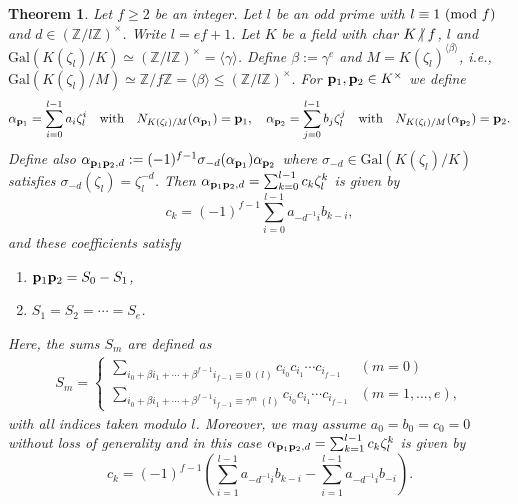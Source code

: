 \documentclass[a4paper, 11pt]{amsart}
\newcommand{\notmid}{\mathrel{\ooalign{$\mkern-5mu\not$\crcr$|$}}}
\newcommand{\Z}{\mathbb Z}
\newcommand{\Gal}{\mathrm{Gal}}
\theoremstyle{plain}
\newtheorem{thm}{Theorem}[section]
\theoremstyle{definition}
\numberwithin{equation}{section}
\begin{document}
\begin{thm}\label{thm:BF2}
Let $f\geq2$ be an integer. 
Let $l$ be an odd prime with $l \equiv 1\ ({\rm mod}\ f)$ and $d \in (\Z/l\Z)^{\times}$. 
Write $l=ef+1$.
Let $K$ be a field with char $K\notmid f$, $l$ and 
$\Gal(K(\zeta_l)/K)\simeq (\Z/l\Z)^{\times}=\langle \gamma \rangle$. 
Define $\beta := \gamma^e$ and $M=K(\zeta_l)^{\langle \beta \rangle}$, 
i.e., $\Gal(K(\zeta_l)/M)\simeq \Z/f\Z = \langle \beta \rangle \leq  (\Z/l\Z)^{\times}$.
For ${\bf p}_1, {\bf p}_2\in K^{\times}$ we define
\begin{align*}
\alpha_{{\bf p}_1}=\sum_{i=0}^{l-1}a_i\zeta_l^i\quad \text{with} \quad
N_{K(\zeta_l)/M}(\alpha_{{\bf p}_1})= {\bf p}_1, \quad \alpha_{{\bf p}_2}=\sum_{j=0}^{l-1}b_j\zeta_l^j\quad \text{with} \quad
N_{K(\zeta_l)/M}(\alpha_{{\bf p}_2})= {\bf p}_2.
\end{align*}
Define also $\alpha_{{\bf p}_1{\bf p}_2,d}:=(-1)^{f-1}\sigma_{-d}(\alpha_{{\bf p}_1})\alpha_{{\bf p}_2}$ where $\sigma_{-d}\in \Gal(K(\zeta_l)/K)$ satisfies $\sigma_{-d}(\zeta_l)=\zeta_l^{-d}$.
Then $\alpha_{{\bf p}_1{\bf p}_2,d} = \sum_{k=0}^{l-1} c_k\zeta_l^k$ is given by
$$c_k = (-1)^{f-1}\sum_{i=0}^{l-1}a_{-d^{-1}i}b_{k-i},$$
and these coefficients satisfy
\begin{enumerate}
\item ${\bf p}_1{\bf p}_2 = S_0 - S_1$,
\item $S_1 = S_2 = \cdots = S_e$.
\end{enumerate}
Here, the sums $S_m$ are defined as
\begin{align*}
S_m = 
\left\{
\begin{array}{ll}
\displaystyle
\sum_{i_0 + \beta i_1 + \cdots +\beta^{f-1}i_{f-1}\equiv 0 \ (l)}c_{i_0}c_{i_1}\cdots c_{i_{f-1}} & (m = 0)\\
\displaystyle
\sum_{i_0 + \beta i_1 + \cdots +\beta^{f-1}i_{f-1}\equiv \gamma^{m} \ (l)}c_{i_0}c_{i_1}\cdots c_{i_{f-1}} & (m = 1,\ldots,e),
\end{array}
\right.
\end{align*}
with all indices taken modulo $l$.
Moreover, we may assume $a_0=b_0=c_0=0$ 
without loss of generality and in this case 
$\alpha_{{\bf p}_1{\bf p}_2,d}=\sum_{k=1}^{l-1}c_k\zeta_l^k$ 
is  given by 
$$c_k=(-1)^{f-1}\left( \sum_{i=1}^{l-1}a_{-d^{-1}i}b_{k-i} - \sum_{i=1}^{l-1}a_{-d^{-1}i}b_{-i}\right).$$
\end{thm}
\end{document}
